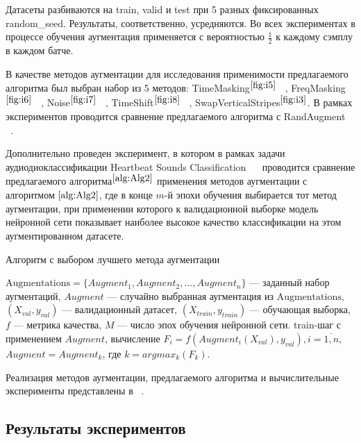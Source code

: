 \documentclass[12pt, fleqn]{article}
\begin{document}
Датасеты разбиваются на train, valid и test при 5 разных фиксированных random\_seed. Результаты, соответственно, усредняются. Во всех экспериментах в процессе обучения аугментация применяется с вероятностью $\frac{1}{2}$ к каждому сэмплу в каждом батче.

В качестве методов аугментации для исследования применимости предлагаемого алгоритма был выбран набор из 5 методов: TimeMasking$^{\ref{fig:i5}}$ ~\cite{SpecAugment}, FreqMasking$^{\ref{fig:i6}}$ ~\cite{SpecAugment}, Noise$^{\ref{fig:i7}}$ ~\cite{AudioClassification}, TimeShift$^{\ref{fig:i8}}$ ~\cite{AudioClassification}, SwapVerticalStripes$^{\ref{fig:i3}}$. В рамках экспериментов проводится сравнение предлагаемого алгоритма с RandAugment ~\cite{RandAugment}.

Дополнительно проведен эксперимент, в котором в рамках задачи аудиодиоклассификации Heartbeat Sounds Classification ~\cite{HeartbeatSoundsArticle}~\cite{HeartbeatSoundsKaggle} проводится сравнение предлагаемого алгоритма$^{\ref{alg:Alg2}}$ применения методов аугментации с алгоритмом ${\ref{alg:Alg2}}$, где в конце $m$-й эпохи обучения выбирается тот метод аугментации, при применении которого к валидационной выборке модель нейронной сети показывает наиболее высокое качество классификации на этом аугментированном датасете.

\begin{algorithm}
\caption{Алгоритм с выбором лучшего метода аугментации}\label{alg:Alg2}
\begin{algorithmic}
\State $\text{Augmentations} = \{Augment_1, Augment_2, ..., Augment_n\}$ --- заданный набор аугментаций,
\State $Augment$ --- случайно выбранная аугментация  из $\text{Augmentations}$,
\State $(X_{val}, y_{val})$ --- валидационный датасет, 
\State $(X_{train}, y_{train})$ --- обучающая выборка,
\State $f$ --- метрика качества,
\State $M$ --- число эпох обучения нейронной сети.
\State train-шаг с применением $Augment$,
\State вычисление $F_i = f(Augment_i(X_{val}), y_{val}), i = \overline{1,n}$,
\State $Augment = Augment_k$, где $k = argmax_k(F_k)$.
\EndFor
\end{algorithmic}
\end{algorithm}

Реализация методов аугментации, предлагаемого алгоритма и вычислительные эксперименты представлены в ~\cite{Experiments}.

\subsection{Результаты экспериментов}
\end{document}
